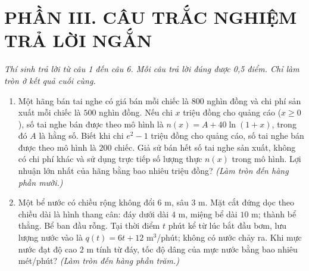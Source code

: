 \documentclass[12pt,a4paper]{article}
\begin{document}
\section*{\large PHẦN III. CÂU TRẮC NGHIỆM TRẢ LỜI NGẮN}
\textit{Thí sinh trả lời từ câu 1 đến câu 6. Mỗi câu trả lời đúng được 0,5 điểm. Chỉ làm tròn ở kết quả cuối cùng.}
\begin{enumerate}
\item Một hãng bán tai nghe có giá bán mỗi chiếc là $800$ nghìn đồng và chi phí sản xuất mỗi chiếc là $500$ nghìn đồng. Nếu chi $x$ triệu đồng cho quảng cáo ($x\geq0$), số tai nghe bán được theo mô hình là $n(x)=A+40\ln(1+x)$, trong đó $A$ là hằng số. Biết khi chi $e^2-1$ triệu đồng cho quảng cáo, số tai nghe bán được theo mô hình là $200$ chiếc. Giả sử bán hết số tai nghe sản xuất, không có chi phí khác và sử dụng trực tiếp số lượng thực $n(x)$ trong mô hình. Lợi nhuận lớn nhất của hãng bằng bao nhiêu triệu đồng? \textit{(Làm tròn đến hàng phần mười.)}

\item \begin{minipage}[t]{0.55\linewidth}
Một bể nước có chiều rộng không đổi $6$ m, sâu $3$ m. Mặt cắt đứng dọc theo chiều dài là hình thang cân: đáy dưới dài $4$ m, miệng bể dài $10$ m; thành bể thẳng. Bể ban đầu rỗng. Tại thời điểm $t$ phút kể từ lúc bắt đầu bơm, lưu lượng nước vào là $q(t)=6t+12$ m$^3$/phút; không có nước chảy ra. Khi mực nước đạt độ cao $2$ m tính từ đáy, tốc độ dâng của mực nước bằng bao nhiêu mét/phút? \textit{(Làm tròn đến hàng phần trăm.)}
\end{minipage}\hfill
\begin{minipage}[t]{0.42\linewidth}
\vspace{-0.4\baselineskip}\centering
{}
\end{minipage}


\end{enumerate}
\end{document}
